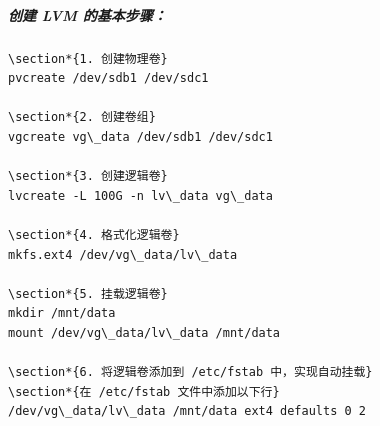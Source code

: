 \documentclass[12pt,UTF8]{ctexbook}
\begin{document}
\subparagraph{创建 LVM 的基本步骤：}
\begin{verbatim}
\section*{1. 创建物理卷}
pvcreate /dev/sdb1 /dev/sdc1

\section*{2. 创建卷组}
vgcreate vg\_data /dev/sdb1 /dev/sdc1

\section*{3. 创建逻辑卷}
lvcreate -L 100G -n lv\_data vg\_data

\section*{4. 格式化逻辑卷}
mkfs.ext4 /dev/vg\_data/lv\_data

\section*{5. 挂载逻辑卷}
mkdir /mnt/data
mount /dev/vg\_data/lv\_data /mnt/data

\section*{6. 将逻辑卷添加到 /etc/fstab 中，实现自动挂载}
\section*{在 /etc/fstab 文件中添加以下行}
/dev/vg\_data/lv\_data /mnt/data ext4 defaults 0 2
\end{verbatim}
\end{document}
